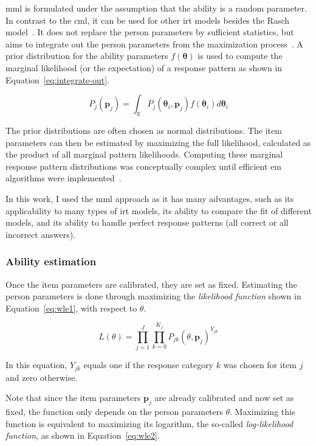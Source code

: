 \Gls{mml} is formulated under the assumption that the ability is a random parameter.
In contrast to the \gls{cml}, it can be used for other \gls{irt} models besides the Rasch model~\cite{bartolucci2010point}.
It does not replace the person parameters by sufficient statistics, but aims to integrate out the person parameters from the maximization process~\cite{bartolucci2010point,magis2017computerized}.
A prior distribution for the ability parameters $f(\bm{\theta})$ is used to compute the marginal likelihood (or the expectation) of a response pattern as shown in Equation~\ref{eq:integrate-out}.

\begin{equation}
    \label{eq:integrate-out}
    P_{j}(\bm{p}_j) = \int_{\mathbb{R}} P_{j}(\bm{\theta}_i,\bm{p}_j) f(\bm{\theta}_i) d\bm{\theta}_i
\end{equation}

The prior distributions are often chosen as normal distributions.
The item parameters can then be estimated by maximizing the full likelihood, calculated as the product of all marginal pattern likelihoods.
Computing these marginal response pattern distributions was conceptually complex until efficient \gls{em} algorithms were implemented~\cite{magis2017computerized}.

In this work, I used the \gls{mml} approach as it has many advantages, such as its applicability to many types of \gls{irt} models, its ability to compare the fit of different models, and its ability to handle perfect response patterns (all correct or all incorrect answers).

\subsubsection{Ability estimation}
Once the item parameters are calibrated, they are set as fixed.
Estimating the person parameters is done through maximizing the \textit{likelihood function} shown in Equation~\ref{eq:wle1}, with respect to $\theta$. 

\begin{equation}
    \label{eq:wle1}
    L(\theta) = \prod_{j=1}^{J} \prod_{k=0}^{K_j} P_{jk}(\theta, \bm{p}_j)^{Y_{jk}}
\end{equation}

In this equation, $Y_{jk}$ equals one if the response category $k$ was chosen for item $j$ and zero otherwise.

Note that since the item parameters $\bm{p}_j$ are already calibrated and now set as fixed, the function only depends on the person parameters $\theta$.
Maximizing this function is equivalent to maximizing its logarithm, the so-called \textit{log-likelihood function}, as shown in Equation~\ref{eq:wle2}.

